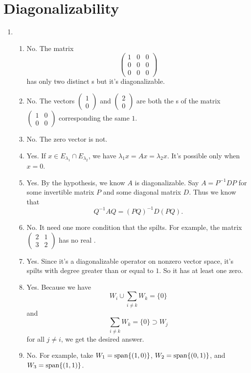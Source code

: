 \section{Diagonalizability}
\begin{enumerate}
\item \begin{enumerate}
\item No. The matrix 
\[\begin{pmatrix}1&0&0\\0&0&0\\0&0&0\end{pmatrix}\]
has only two distinct \egva s but it's diagonalizable.
\item No. The vectors $\begin{pmatrix}1\\0\end{pmatrix}$ and $\begin{pmatrix}2\\0\end{pmatrix}$ are both the \egve s of the matrix $\begin{pmatrix}1&0\\0&0\end{pmatrix}$ corresponding the same \egva{} $1$.
\item No. The zero vector is not.
\item Yes. If $x\in E_{\lambda_1}\cap E_{\lambda_2}$, we have $\lambda_1x=Ax=\lambda_2x$. It's possible only when $x=0$.
\item Yes. By the hypothesis, we know $A$ is diagonalizable. Say $A=P^{-1}DP$ for some invertible matrix $P$ and some diagonal matrix $D$. Thus we know that 
\[Q^{-1}AQ=(PQ)^{-1}D(PQ).\]
\item No. It need one more condition that the \charpoly{} spilts. For example, the matrix $\begin{pmatrix}2&1\\3&2\end{pmatrix}$ has no real \egva .
\item Yes. Since it's a diagonalizable operator on nonzero vector space, it's \charpoly{} spilts with degree greater than or equal to $1$. So it has at least one zero.
\item Yes. Because we have 
\[W_i\cup \sum_{i\neq k}{W_k}=\{0\}\]
and 
\[\sum_{i\neq k}{W_k}=\{0\}\supset W_j\]
for all $j\neq i$, we get the desired answer.
\item No. For example, take $W_1=\sp\{(1,0)\}$, $W_2=\sp\{(0,1)\}$, and $W_3=\sp\{(1,1)\}$.
\end{enumerate}

\end{enumerate}
